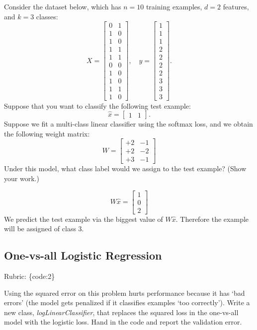 \documentclass{article}
\def\rubric#1{\gre{Rubric: \{#1\}}}{}
\def\blu#1{{\color{blu}#1}}
\def\gre#1{{\color{gre}#1}}
\def\red#1{{\color{red}#1}}
\begin{document}
Consider the dataset below, which has $n=10$ training examples, $d=2$ features, and $k=3$ classes:
\[
X = \begin{bmatrix}0 & 1\\1 & 0\\ 1 & 0\\ 1 & 1\\ 1 & 1\\ 0 & 0\\  1 & 0\\  1 & 0\\  1 & 1\\  1 &0\end{bmatrix}, \quad y = \begin{bmatrix}1\\1\\1\\2\\2\\2\\2\\3\\3\\3\end{bmatrix}.
\]
Suppose that you want to classify the following test example:
\[
\hat{x} = \begin{bmatrix}1 & 1\end{bmatrix}.
\]
Suppose we fit a multi-class linear classifier using the softmax loss, and we obtain the following weight matrix:
\[
W =
\begin{bmatrix}
+2 & -1\\
+2 & -2\\
+3 & -1
\end{bmatrix}
\]
\blu{Under this model, what class label would we assign to the test example? (Show your work.)}

\red{\[W\hat{x} =
\begin{bmatrix}
1\\
0\\
2
\end{bmatrix}
\]
We predict the test example via the biggest value of $W\hat{x}$. Therefore the example will be assigned of class 3.
}

\subsection{One-vs-all Logistic Regression}
\rubric{code:2}

Using the squared error on this problem hurts performance because it has `bad errors' (the model gets penalized if it classifies examples `too correctly').
Write a new class, \emph{logLinearClassifier}, that replaces the squared loss in the one-vs-all model with the logistic loss. \blu{Hand in the code and report the validation error}.
\end{document}
